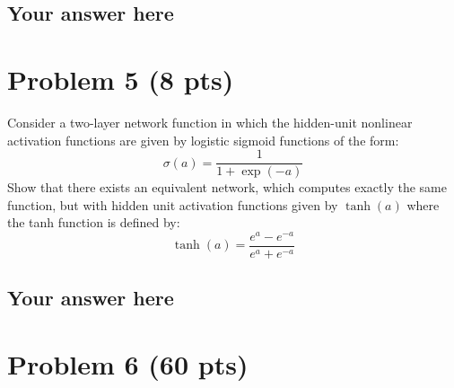 \documentclass{article}
\begin{document}
\subsection*{Your answer here}


\section*{Problem 5 (8 pts)}
Consider a two-layer network function in which the hidden-unit nonlinear activation functions are given by logistic sigmoid functions of the
form:
\begin{equation}
\sigma(a) = \frac{1}{1 + \exp(-a)}
\end{equation}
Show that there exists an equivalent network, which computes exactly the same 
function, but with hidden unit activation functions 
given by $\tanh(a)$ where the tanh function is defined by:
\begin{equation}
\tanh(a) = \frac{e^a - e^{-a}}{e^a + e^{-a}}
\end{equation}

\subsection*{Your answer here}

\section*{Problem 6 (60 pts)}
\end{document}
